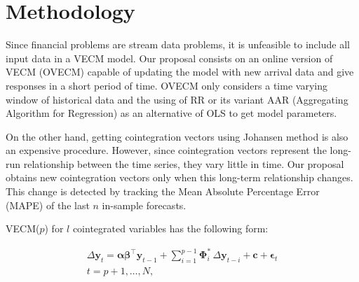\documentclass[twocolumn]{svjour3}          %
\begin{document}
\section{Methodology} \label{sec:methodology}

Since financial problems are stream data problems, it is unfeasible to include
all input data in a VECM model. Our proposal consists on an online version of
VECM (OVECM) capable of updating the model with new arrival data and give
responses in a short period of time. OVECM only considers a time varying window
of historical data and the using of RR or its variant AAR (Aggregating Algorithm
for Regression) as an alternative of OLS to get model parameters.

On the other hand, getting cointegration vectors using Johansen method is also
an expensive procedure. However, since cointegration
vectors represent the long-run relationship between the time series, they
vary little in time. Our proposal obtains new cointegration vectors only when
this long-term relationship changes. This change is detected by tracking 
the Mean Absolute Percentage Error (MAPE) of the last $n$ in-sample forecasts.

% 
%





VECM($p$) for $l$ cointegrated variables has the following form:


\begin{align}
\label{eq:vecfull}
\Delta\mathbf{y}_t 
= \boldsymbol{\alpha\beta}^\top\mathbf{y}_{t-1} 
  + \sum_{i=1}^{p-1}\boldsymbol{\Phi}_i^*\,\Delta\mathbf{y}_{t-i}
  + \mathbf{c} + \boldsymbol{\epsilon}_t  \nonumber \\
t=p+1,\dots,N,
\end{align}
\end{document}
